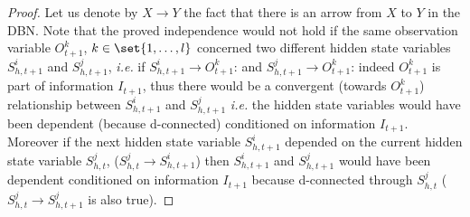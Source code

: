 \begin{proof}
Let us denote by $X \rightarrow Y$
the fact that there is an arrow from $X$ to $Y$
in the DBN.
Note that the proved independence would not hold if
the same observation variable $O_{t+1}^k$,
$k \in \set{1,\ldots,l}$ concerned two different hidden
state variables $S^i_{h,t+1}$ and $S^j_{h,t+1}$,
\textit{i.e.} if $S^i_{h,t+1} \rightarrow O_{t+1}^k$:
and $S^j_{h,t+1} \rightarrow O_{t+1}^k$: 
indeed $O^k_{t+1}$ is part of information $I_{t+1}$, 
thus there would be a convergent (towards $O^k_{t+1}$) 
relationship between $S^i_{h,t+1}$ and $S^j_{h,t+1}$
\textit{i.e.} the hidden state variables would have been dependent 
(because d-connected)
conditioned on information $I_{t+1}$. 
Moreover if the next hidden state variable $S^i_{h,t+1}$ depended 
on the current hidden state variable $S^j_{h,t}$,
($S^j_{h,t} \rightarrow S^i_{h,t+1}$) 
then $S^i_{h,t+1}$ and $S^j_{h,t+1}$ would have 
been dependent conditioned on information 
$I_{t+1}$ because d-connected through $S^j_{h,t}$
($S^j_{h,t} \rightarrow S^j_{h,t+1}$ is also true). 
\end{proof}
